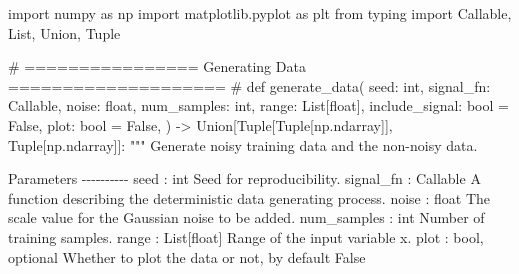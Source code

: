 \documentclass[
  0.875em,
  letterpaper,
  DIV=11,
  numbers=noendperiod]{scrartcl}
\newenvironment{Shaded}{\begin{snugshade}}{\end{snugshade}}
\newcommand{\BuiltInTok}[1]{\textcolor[rgb]{0.00,0.23,0.31}{#1}}
\newcommand{\CommentTok}[1]{\textcolor[rgb]{0.37,0.37,0.37}{#1}}
\newcommand{\ImportTok}[1]{\textcolor[rgb]{0.00,0.46,0.62}{#1}}
\newcommand{\KeywordTok}[1]{\textcolor[rgb]{0.00,0.23,0.31}{#1}}
\newcommand{\NormalTok}[1]{\textcolor[rgb]{0.00,0.23,0.31}{#1}}
\newcommand{\OperatorTok}[1]{\textcolor[rgb]{0.37,0.37,0.37}{#1}}
\newcommand{\VariableTok}[1]{\textcolor[rgb]{0.07,0.07,0.07}{#1}}
\begin{document}
\begin{Shaded}
\begin{Highlighting}[]
\ImportTok{import}\NormalTok{ numpy }\ImportTok{as}\NormalTok{ np}
\ImportTok{import}\NormalTok{ matplotlib.pyplot }\ImportTok{as}\NormalTok{ plt}
\ImportTok{from}\NormalTok{ typing }\ImportTok{import}\NormalTok{ Callable, List, Union, Tuple}

\CommentTok{\# ================ Generating Data ==================== \#}
\KeywordTok{def}\NormalTok{ generate\_data(}
\NormalTok{    seed: }\BuiltInTok{int}\NormalTok{,}
\NormalTok{    signal\_fn: Callable,}
\NormalTok{    noise: }\BuiltInTok{float}\NormalTok{,}
\NormalTok{    num\_samples: }\BuiltInTok{int}\NormalTok{,}
    \BuiltInTok{range}\NormalTok{: List[}\BuiltInTok{float}\NormalTok{],}
\NormalTok{    include\_signal: }\BuiltInTok{bool} \OperatorTok{=} \VariableTok{False}\NormalTok{,}
\NormalTok{    plot: }\BuiltInTok{bool} \OperatorTok{=} \VariableTok{False}\NormalTok{,}
\NormalTok{) }\OperatorTok{{-}\textgreater{}}\NormalTok{ Union[Tuple[Tuple[np.ndarray]], Tuple[np.ndarray]]:}
    \CommentTok{"""}
\CommentTok{    Generate noisy training data and the non{-}noisy data.}

\CommentTok{    Parameters}
\CommentTok{    {-}{-}{-}{-}{-}{-}{-}{-}{-}{-}}
\CommentTok{    seed : int}
\CommentTok{        Seed for reproducibility.}
\CommentTok{    signal\_fn : Callable}
\CommentTok{        A function describing the deterministic data generating process.}
\CommentTok{    noise : float}
\CommentTok{        The \textasciigrave{}scale\textasciigrave{} value for the Gaussian noise to be added.}
\CommentTok{    num\_samples : int}
\CommentTok{        Number of training samples.}
\CommentTok{    range : List[float]}
\CommentTok{        Range of the input variable x.}
\CommentTok{    plot : bool, optional}
\CommentTok{        Whether to plot the data or not, by default False}


\end{Highlighting}
\end{Shaded}
\end{document}

